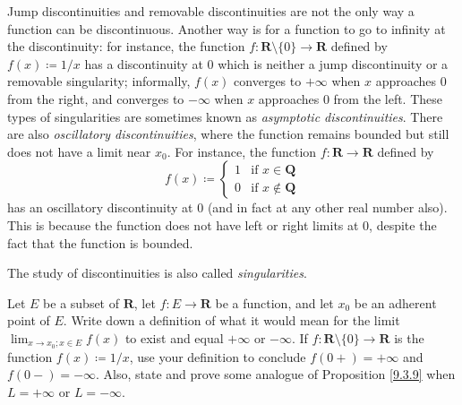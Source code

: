 \begin{remark}\label{9.5.4}
    Jump discontinuities and removable discontinuities are not the only way a function can be discontinuous.
    Another way is for a function to go to infinity at the discontinuity:
    for instance, the function \(f : \mathbf{R} \setminus \{0\} \to \mathbf{R}\) defined by \(f(x) \coloneqq 1 / x\) has a discontinuity at \(0\) which is neither a jump discontinuity or a removable singularity;
    informally, \(f(x)\) converges to \(+\infty\) when \(x\) approaches \(0\) from the right, and converges to \(-\infty\) when \(x\) approaches \(0\) from the left.
    These types of singularities are sometimes known as \emph{asymptotic discontinuities}.
    There are also \emph{oscillatory discontinuities}, where the function remains bounded but still does not have a limit near \(x_0\).
    For instance, the function \(f : \mathbf{R} \to \mathbf{R}\) defined by
    \[
        f(x) \coloneqq \begin{cases}
            1 & \text{if } x \in \mathbf{Q} \\
            0 & \text{if } x \notin \mathbf{Q}
        \end{cases}
    \]
    has an oscillatory discontinuity at \(0\) (and in fact at any other real number also).
    This is because the function does not have left or right limits at \(0\), despite the fact that the function is bounded.
\end{remark}

\begin{note}
    The study of discontinuities is also called \emph{singularities}.
\end{note}

\exercisesection

\begin{exercise}\label{ex 9.5.1}
    Let \(E\) be a subset of \(\mathbf{R}\), let \(f : E \to \mathbf{R}\) be a function, and let \(x_0\) be an adherent point of \(E\).
    Write down a definition of what it would mean for the limit \(\lim_{x \to x_0 ; x \in E} f(x)\) to exist and equal \(+\infty\) or \(-\infty\).
    If \(f : \mathbf{R} \setminus \{0\} \to \mathbf{R}\) is the function \(f(x) \coloneqq 1 / x\), use your definition to conclude \(f(0+) = +\infty\) and \(f(0-) = -\infty\).
    Also, state and prove some analogue of Proposition \ref{9.3.9} when \(L = +\infty\) or \(L = -\infty\).
\end{exercise}

